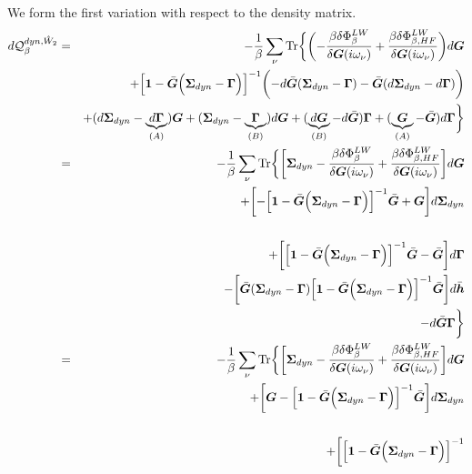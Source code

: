 \documentclass[11pt,a4paper]{report}
\begin{document}
We form the first variation with respect to the density matrix.
\begin{eqnarray}
d\mathcal{Q}_{\beta}^{dyn,\hat{W}_2}
&=&
-\frac{1}{\beta}\sum_\nu\Tr\biggl\lbrace
\biggl(-\frac{\beta\delta\Phi^{LW}_\beta}{\delta\mat{G}(i\omega_\nu)}
+\frac{\beta\delta\Phi^{LW}_{\beta,HF}}{\delta\mat{G}(i\omega_\nu)}\biggr)d\mat{G}
\nonumber\\
&&+\Bigl[\mat{1}-\bar{\mat{G}}
\Bigl(\mat{\Sigma}_{dyn}-\mat{\Gamma}\Bigr)\Bigr]^{-1}
\biggl(-d\bar{\mat{G}}(\mat{\Sigma}_{dyn}-\mat{\Gamma})
-\bar{\mat{G}}(d\mat{\Sigma}_{dyn}-d\mat{\Gamma})\biggr)
\nonumber\\
&&+(d\mat{\Sigma}_{dyn}-\underbrace{d\mat{\Gamma}}_{(A)})\mat{G}
+(\mat{\Sigma}_{dyn}-\underbrace{\mat{\Gamma}}_{(B)})d\mat{G}
+(\underbrace{d\mat{G}}_{(B)}-d\bar{\mat{G}})\mat{\Gamma}
+(\underbrace{\mat{G}}_{(A)}-\bar{\mat{G}})d\mat{\Gamma}
\biggr\rbrace
\nonumber\\
&=&
-\frac{1}{\beta}\sum_\nu\Tr\biggl\lbrace
\biggr[\mat{\Sigma}_{dyn}
-\frac{\beta\delta\Phi^{LW}_\beta}{\delta\mat{G}(i\omega_\nu)}
+\frac{\beta\delta\Phi^{LW}_{\beta,HF}}{\delta\mat{G}(i\omega_\nu)}
\biggr]d\mat{G}
\nonumber\\
&&+\biggl[
-\Bigl[\mat{1}-\bar{\mat{G}}
\Bigl(\mat{\Sigma}_{dyn}-\mat{\Gamma}\Bigr)\Bigr]^{-1}
\bar{\mat{G}}+\mat{G}\biggr]d\mat{\Sigma}_{dyn}
\nonumber\\
&&
\nonumber\\
&&+\biggl[\Bigl[\mat{1}-\bar{\mat{G}}
\Bigl(\mat{\Sigma}_{dyn}-\mat{\Gamma}\Bigr)\Bigr]^{-1}
\bar{\mat{G}}
-\bar{\mat{G}}
\biggr]d\mat{\Gamma}
\nonumber\\
&&
-\biggl[\bar{\mat{G}}(\mat{\Sigma}_{dyn}-\mat{\Gamma})
\Bigl[\mat{1}-\bar{\mat{G}}
\Bigl(\mat{\Sigma}_{dyn}-\mat{\Gamma}\Bigr)\Bigr]^{-1}
\bar{\mat{G}}\biggr]d\bar{\mat{h}}
\nonumber\\
&&
-d\bar{\mat{G}}\mat{\Gamma}
\biggr\rbrace
\nonumber\\
&=&
-\frac{1}{\beta}\sum_\nu\Tr\biggl\lbrace
\biggr[\mat{\Sigma}_{dyn}
-\frac{\beta\delta\Phi^{LW}_\beta}{\delta\mat{G}(i\omega_\nu)}
+\frac{\beta\delta\Phi^{LW}_{\beta,HF}}{\delta\mat{G}(i\omega_\nu)}
\biggr]d\mat{G}
\nonumber\\
&&+\biggl[
\mat{G}-\Bigl[\mat{1}-\bar{\mat{G}}
\Bigl(\mat{\Sigma}_{dyn}-\mat{\Gamma}\Bigr)\Bigr]^{-1}
\bar{\mat{G}}\biggr]d\mat{\Sigma}_{dyn}
\nonumber\\
&&
\nonumber\\
&&+\biggl[
\Bigl[\mat{1}-\bar{\mat{G}}
\Bigl(\mat{\Sigma}_{dyn}-\mat{\Gamma}\Bigr)\Bigr]^{-1}

\end{eqnarray}
\end{document}
